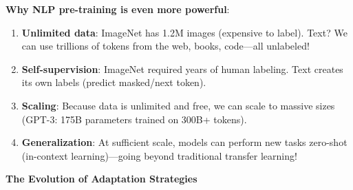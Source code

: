 \documentclass{article}
\begin{document}
\begin{tcolorbox}[colback=blue!5!white, colframe=blue!75!black, title=The Crucial Advantage of NLP]
\textbf{Why NLP pre-training is even more powerful}:

\begin{enumerate}
\item \textbf{Unlimited data}: ImageNet has 1.2M images (expensive to label). Text? We can use trillions of tokens from the web, books, code---all unlabeled!

\item \textbf{Self-supervision}: ImageNet required years of human labeling. Text creates its own labels (predict masked/next token).

\item \textbf{Scaling}: Because data is unlimited and free, we can scale to massive sizes (GPT-3: 175B parameters trained on 300B+ tokens).

\item \textbf{Generalization}: At sufficient scale, models can perform new tasks zero-shot (in-context learning)---going beyond traditional transfer learning!
\end{enumerate}
\end{tcolorbox}

\textbf{The Evolution of Adaptation Strategies}
\end{document}
